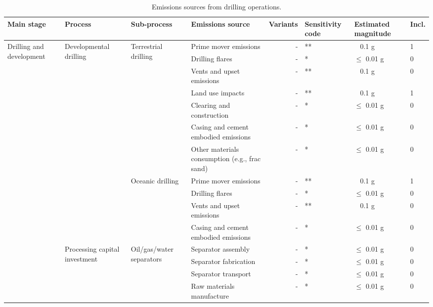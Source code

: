 \documentclass[11pt]{report}
\begin{document}
\begin{landscape}
\begin{table}
\begin{scriptsize}
\caption{Emissions sources from drilling operations.}
\label{tab:drilling_sources}
\begin{tabular}{|p{}|p{}|p{}|p{}|r|p{}|p{}|p{}|}
\hline
\textbf{Main stage} & \textbf{Process} & \textbf{Sub-process} & \textbf{Emissions source} & \textbf{Variants}& \textbf{Sensitivity code} & \textbf{Estimated magnitude} & \textbf{Incl.}\\
\hline
\multirow{30}{0.08\columnwidth}{Drilling and development} & \multirow{11}{0.09\columnwidth}{Developmental drilling} & \multirow{7}{0.12\columnwidth}{Terrestrial drilling} & Prime mover emissions & - & ** & ~ 0.1 g & 1\\
\cline{4-8}
& & & Drilling flares & - & * & $\leq$ 0.01 g & 0\\
\cline{4-8}
& & & Vents and upset emissions & - & ** & ~ 0.1 g & 0\\
\cline{4-8}
& & & Land use impacts & - & ** & ~ 0.1 g & 1\\
\cline{4-8}
& & & Clearing and construction & - & * & $\leq$ 0.01 g & 0\\
\cline{4-8}
& & & Casing and cement embodied emissions & - & * & $\leq$ 0.01 g & 0\\
\cline{4-8}
& & & Other materials consumption (e.g., frac sand) & - & * & $\leq$ 0.01 g & 0\\
\cline{3-8}
& & \multirow{4}{*}{Oceanic drilling} & Prime mover emissions & - & ** & ~ 0.1 g & 1\\
\cline{4-8}
& & & Drilling flares & - & * & $\leq$ 0.01 g & 0\\
\cline{4-8}
& & & Vents and upset emissions & - & ** & ~ 0.1 g & 0\\
\cline{4-8}
& & & Casing and cement embodied emissions & - & * & $\leq$ 0.01 g & 0\\
\cline{2-8}
& \multirow{8}{0.09\columnwidth}{Processing capital investment} & \multirow{4}{0.12\columnwidth}{Oil/gas/water separators} & Separator assembly & - & * & $\leq$ 0.01 g & 0\\
\cline{4-8}
& & & Separator fabrication & - & * & $\leq$ 0.01 g & 0\\
\cline{4-8}
& & & Separator transport & - & * & $\leq$ 0.01 g & 0\\
\cline{4-8}
& & & Raw materials manufacture & - & * & $\leq$ 0.01 g & 0\\

\end{tabular}
\end{scriptsize}
\end{table}
\end{landscape}
\end{document}
